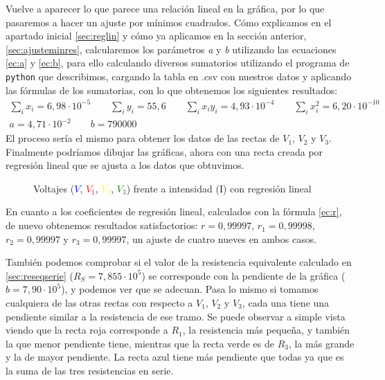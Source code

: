 \documentclass[12pt, a4paper, titlepage]{article}
\newcommand{\code}[1]{\texttt{#1}} %
\begin{document}
  Vuelve a aparecer lo que parece una relación lineal en la gráfica, por lo que pasaremos a hacer un ajuste por mínimos cuadrados. Cómo explicamos en el apartado inicial \ref{sec:reglin} y cómo ya aplicamos en la sección anterior, \ref{sec:ajusteminres}, calcularemos los parámetros \textit{a} y \textit{b} utilizando las ecuaciones \ref{ec:a} y \ref{ec:b}, para ello calculando diversos sumatorios utilizando el programa de \code{python} que describimos, cargando la tabla en .csv con nuestros datos y aplicando las fórmulas de los sumatorias, con lo que obtenemos los siguientes resultados:
  \begin{gather}
    \sum_i x_i = 6,98\cdot10^{-5} \nonumber \qquad \sum_i y_i = 55,6 \nonumber \qquad \sum_i x_iy_i = 4,93\cdot10^{-4} \nonumber \qquad \sum_i x_i^2 = 6,20\cdot10^{-10} \nonumber \\
    a = 4,71\cdot10^{-2} \nonumber \qquad b = 790000 \label{v:serie}
  \end{gather}
  El proceso sería el mismo para obtener los datos de las rectas de $V_1$, $V_2$ y $V_3$. Finalmente podríamos dibujar las gráficas, ahora con una recta creada por regresión lineal que se ajusta a los datos que obtuvimos.

  \begin{figure}[H]
    \hspace{2.5em} 
    \caption{Voltajes (\textcolor{Blue}{$V$}, \textcolor{Red}{$V_1$}, \textcolor{Yellow}{$V_2$}, \textcolor{Green}{$V_3$}) frente a intensidad (I) con regresión lineal}
  \end{figure}

  En cuanto a los coeficientes de regresión lineal, calculados con la fórmula \ref{ec:r}, de nuevo obtenemos resultados satisfactorios: $r = 0,99997$, $r_1 = 0,99998$, $r_2 = 0,99997$ y $r_3 = 0,99997$, un ajuste de cuatro nueves en ambos casos.

  También podemos comprobar si el valor de la resistencia equivalente calculado en \ref{sec:reseqserie} ($R_S = 7,855 \cdot 10^5$) se corresponde con la pendiente de la gráfica ($b = 7,90 \cdot 10^5$), y podemos ver que se adecuan. Pasa lo mismo si tomamos cualquiera de las otras rectas con respecto a $V_1$, $V_2$ y $V_3$, cada una tiene una pendiente similar a la resistencia de ese tramo. Se puede observar a simple vista viendo que la recta roja corresponde a $R_1$, la resistencia más pequeña, y también la que menor pendiente tiene, mientras que la recta verde es de $R_3$, la más grande y la de mayor pendiente. La recta azul tiene más pendiente que todas ya que es la suma de las tres resistencias en serie.
\end{document}
